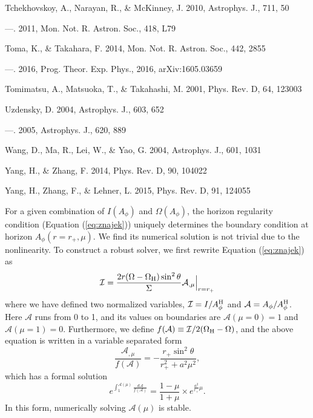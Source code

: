 \documentclass[iop,apj]{emulateapj}
\def\sst{\sin^2\theta}
\def\be{\begin{equation}}
\def\ee{\end{equation}}
\def\WH{\Omega_{\rm H}}
\def\AB{A_\phi^{\rm H}}
\begin{document}
\begin{thebibliography}{}
Tchekhovskoy, A., Narayan, R., \& McKinney, J. 2010, Astrophys. J., 711, 50

---. 2011, Mon. Not. R. Astron. Soc., 418, L79

Toma, K., \& Takahara, F. 2014, Mon. Not. R. Astron. Soc., 442, 2855

---. 2016, Prog. Theor. Exp. Phys., 2016, arXiv:1605.03659

Tomimatsu, A., Matsuoka, T., \& Takahashi, M. 2001, Phys. Rev. D, 64, 123003

Uzdensky, D. 2004, Astrophys. J., 603, 652

---. 2005, Astrophys. J., 620, 889

Wang, D., Ma, R., Lei, W., \& Yao, G. 2004, Astrophys. J., 601, 1031

Yang, H., \& Zhang, F. 2014, Phys. Rev. D, 90, 104022

Yang, H., Zhang, F., \& Lehner, L. 2015, Phys. Rev. D, 91, 124055

\end{thebibliography}




\appendix
\label{sec:app}
For a given combination of $I(A_\phi)$ and $\Omega(A_\phi)$,
the horizon regularity condition (Equation (\ref{eq:znajek}))
uniquely determines the boundary condition at horizon $A_\phi(r= r_+, \mu)$.
We find its numerical solution is not trivial due to the nonlinearity.
To construct a robust solver, we first rewrite Equation (\ref{eq:znajek}) as
\be
    \mathcal I = \frac{2r(\Omega-\WH)\sst}{\Sigma} \mathcal A_{,\mu}\Big|_{r=r_+}
\ee
where we have defined two normalized variables, $\mathcal I = I / \AB$ and $\mathcal A = A_\phi / \AB$.
Here $\mathcal A $ runs from 0 to 1, and its values on boundaries are
$\mathcal A(\mu=0) = 1$ and $\mathcal A(\mu=1) = 0$.
Furthermore, we define $f(\mathcal A) \equiv \mathcal I/2(\WH - \Omega) $, and the above equation
is written in a variable separated form
\be
\frac{\mathcal A_{,\mu}}{f(\mathcal A)} = -\frac{r_+ \sst}{r_+^2 + a^2\mu^2},
\ee
which has a formal solution
\be
\label{eq:fs}
e^{\int_1^{\mathcal A(\mu)}\frac{d\mathcal A}{f(\mathcal A)}}
 = \frac{1-\mu}{1+\mu} \times e^{\frac{a^2}{r_+}\mu}.
\ee
In this form, numerically solving $\mathcal A(\mu)$ is stable.
\end{document}
